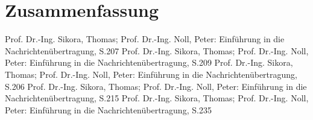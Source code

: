 
\section{Zusammenfassung}
\begin{quote}
	
\end{quote}



\begin{thebibliography}{999}
 Prof. Dr.-Ing. Sikora, Thomas; Prof. Dr.-Ing. Noll, Peter: Einführung in die
Nachrichtenübertragung, S.207
 Prof. Dr.-Ing. Sikora, Thomas; Prof. Dr.-Ing. Noll, Peter: Einführung in die
Nachrichtenübertragung, S.209
 Prof. Dr.-Ing. Sikora, Thomas; Prof. Dr.-Ing. Noll, Peter: Einführung in die
Nachrichtenübertragung, S.206
 Prof. Dr.-Ing. Sikora, Thomas; Prof. Dr.-Ing. Noll, Peter: Einführung in die
Nachrichtenübertragung, S.215
 Prof. Dr.-Ing. Sikora, Thomas; Prof. Dr.-Ing. Noll, Peter: Einführung in die
Nachrichtenübertragung, S.235



\end{thebibliography}


